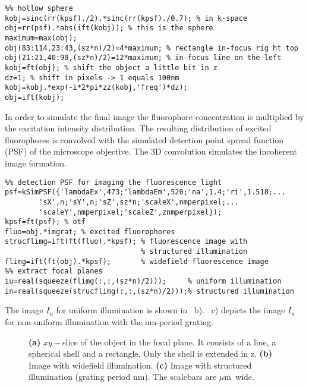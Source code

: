 \begin{lstlisting}
%% hollow sphere
kobj=sinc(rr(kpsf)./2).*sinc(rr(kpsf)./0.7); % in k-space
obj=rr(psf).*abs(ift(kobj)); % this is the sphere
maximum=max(obj);
obj(83:114,23:43,(sz*n)/2)=4*maximum; % rectangle in-focus rig ht top
obj(21:21,40:90,(sz*n)/2)=12*maximum; % in-focus line on the left
kobj=ft(obj); % shift the object a little bit in z
dz=1; % shift in pixels -> 1 equals 100nm
kobj=kobj.*exp(-i*2*pi*zz(kobj,'freq')*dz);
obj=ift(kobj);
\end{lstlisting}
In order to simulate the final image the fluorophore concentration is
multiplied by the excitation intensity distribution. The resulting
distribution of excited fluorophores is convolved with the simulated
detection point spread function (PSF)   of the
microscope objective. The 3D convolution simulates the incoherent
image formation.
\begin{lstlisting}
%% detection PSF for imaging the fluorescence light
psf=kSimPSF({'lambdaEx',473;'lambdaEm',520;'na',1.4;'ri',1.518;...
        'sX',n;'sY',n;'sZ',sz*n;'scaleX',nmperpixel;...
        'scaleY',nmperpixel;'scaleZ',znmperpixel});
kpsf=ft(psf); % otf
fluo=obj.*imgrat; % excited fluorophores
strucflimg=ift(ft(fluo).*kpsf); % fluorescence image with 
                                % structured illumination
flimg=ift(ft(obj).*kpsf);       % widefield fluorescence image
%% extract focal planes
iu=real(squeeze(flimg(:,:,(sz*n)/2)));     % uniform illumination
in=real(squeeze(strucflimg(:,:,(sz*n)/2)));% structured illumination
\end{lstlisting}
The image $I_u$ for uniform illumination is shown in
~b). ~c) depicts the image $I_n$
for non-uniform illumination with the \unit[600]{nm}-period grating.
\begin{figure}[!htb]
  \centering


  \caption{{\bf(a)} $xy-$slice of the object in the focal plane. It
    consists of a line, a spherical shell and a rectangle. Only the
    shell is extended in z. {\bf(b)} Image with widefield
    illumination. {\bf(c)} Image with structured illumination (grating
    period \unit[600]{nm}).  The scalebars are \unit[2]{$\mu$m}
    wide. }
  \label{fig:input}
\end{figure}
